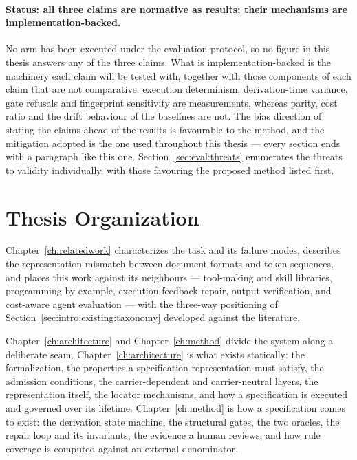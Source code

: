\paragraph{Status: all three claims are normative as results; their mechanisms are
implementation-backed.}
No arm has been executed under the evaluation protocol, so no figure in this thesis answers
any of the three claims. What is implementation-backed is the machinery each claim will be
tested with, together with those components of each claim that are not comparative: execution
determinism, derivation-time variance, gate refusals and fingerprint sensitivity are
measurements, whereas parity, cost ratio and the drift behaviour of the baselines are not. The
bias direction of stating the claims ahead of the results is favourable to the method, and the
mitigation adopted is the one used throughout this thesis --- every section ends with a
paragraph like this one. Section~\ref{sec:eval:threats} enumerates the threats to validity
individually, with those favouring the proposed method listed first.

\section{Thesis Organization}
\label{sec:intro:organization}

Chapter~\ref{ch:relatedwork} characterizes the task and its failure modes, describes the
representation mismatch between document formats and token sequences, and places this work
against its neighbours --- tool-making and skill libraries, programming by example,
execution-feedback repair, output verification, and cost-aware agent evaluation --- with the
three-way positioning of Section~\ref{sec:intro:existing:taxonomy} developed against the
literature.

Chapter~\ref{ch:architecture} and Chapter~\ref{ch:method} divide the system along a deliberate
seam. Chapter~\ref{ch:architecture} is what exists statically: the formalization, the
properties a specification representation must satisfy, the admission conditions, the
carrier-dependent and carrier-neutral layers, the representation itself, the locator
mechanisms, and how a specification is executed and governed over its lifetime.
Chapter~\ref{ch:method} is how a specification comes to exist: the derivation state machine,
the structural gates, the two oracles, the repair loop and its invariants, the evidence a human
reviews, and how rule coverage is computed against an external denominator.

